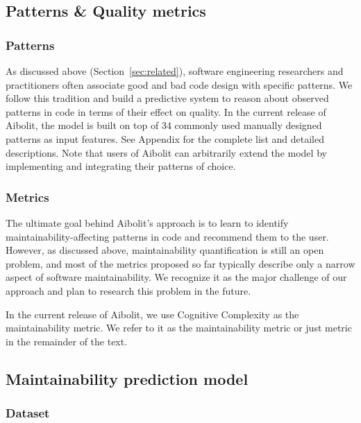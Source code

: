 \subsection{Patterns \& Quality metrics} 
\label{sec:aibolit_patterns_metrics}

\subsubsection*{Patterns}

As discussed above (Section~\ref{sec:related}), 
software engineering researchers and practitioners often associate
good and bad code design with specific patterns. We follow this tradition and
build a predictive system to reason about observed patterns in code in terms of their effect on quality. 
In the current release of Aibolit, the model is built on top of 34
commonly used manually designed patterns as input features. See Appendix
for the complete list and detailed descriptions. Note that users of Aibolit
can arbitrarily extend the model by implementing and integrating their patterns
of choice.

\subsubsection*{Metrics}

The ultimate goal behind Aibolit's approach is to
learn to identify maintainability-affecting patterns in code and recommend them
to the user. However, as discussed above, maintainability quantification is
still an open problem, and most of the metrics proposed so far typically
describe only a narrow aspect of software maintainability. We recognize it as
the major challenge of our approach and plan to research this problem in the
future.

In the current release of Aibolit, we use Cognitive Complexity \citep{10.1145/3194164.3194186} as 
the maintainability metric. We refer to it as the maintainability metric or just
metric in the remainder of the text. 

\subsection{Maintainability prediction model}  

\label{sec:maint_pred_model}

\subsubsection*{Dataset}  

